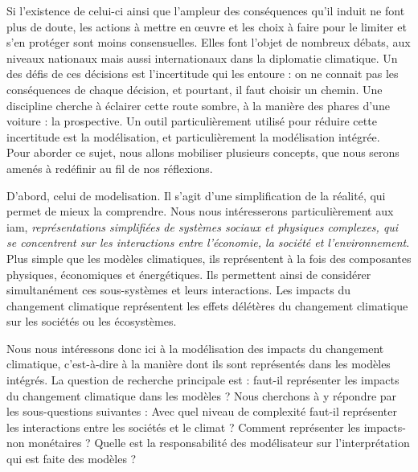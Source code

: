 Si l'existence de celui-ci ainsi que l'ampleur des conséquences qu'il induit ne font plus de doute, les actions à mettre en œuvre et les choix à faire pour le limiter et s'en protéger sont moins consensuelles. Elles font l'objet de nombreux débats, aux niveaux nationaux mais aussi internationaux dans la diplomatie climatique. Un des défis de ces décisions est l'incertitude qui les entoure : on ne connait pas les conséquences de chaque décision, et pourtant, il faut choisir un chemin. Une discipline cherche à éclairer cette route sombre, à la manière des phares d'une voiture : la prospective. Un outil particulièrement utilisé pour réduire cette incertitude est la modélisation, et particulièrement la modélisation intégrée. \\


Pour aborder ce sujet, nous allons mobiliser plusieurs concepts, que nous serons amenés à redéfinir au fil de nos réflexions. 


D'abord, celui de \gls{modelisation}. Il s'agit d'une simplification de la réalité, qui permet de mieux la comprendre. Nous nous intéresserons particulièrement aux \gls{iam}, \textit{représentations simplifiées de systèmes sociaux et physiques complexes, qui se concentrent sur les interactions entre l'économie, la société et l'environnement}. Plus simple que les modèles climatiques, ils représentent à la fois des composantes physiques, économiques et énergétiques. Ils permettent ainsi de considérer simultanément ces sous-systèmes et leurs interactions. Les impacts du changement climatique représentent les effets délétères du changement climatique sur les sociétés ou les écosystèmes. 





Nous nous intéressons donc ici à la modélisation des impacts du changement climatique, c'est-à-dire à la manière dont ils sont représentés dans les modèles intégrés. La question de recherche principale est : faut-il représenter les impacts du changement climatique dans les modèles ? Nous cherchons à y répondre par les sous-questions suivantes : Avec quel niveau de complexité faut-il représenter les interactions entre les sociétés et le climat ? Comment représenter les impacts-non monétaires ? Quelle est la responsabilité des modélisateur sur l'interprétation qui est faite des modèles ?  \\

